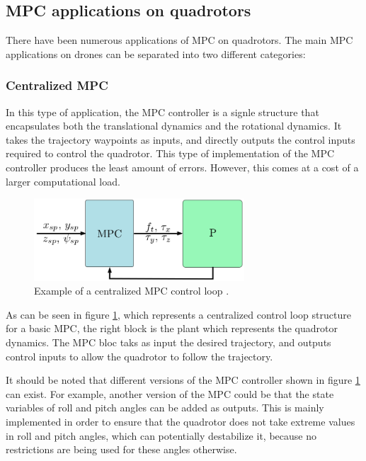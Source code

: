 \documentclass{thesisreport}
\begin{document}
\subsection{MPC applications on quadrotors}

 There have been numerous applications of MPC on quadrotors. The main MPC applications on drones can be separated into two different categories:

\subsubsection{Centralized MPC}
 
In this type of application, the MPC controller is a signle structure that encapsulates both the translational dynamics and the rotational dynamics. It takes the trajectory waypoints as inputs, and directly outputs the control inputs required to control the quadrotor. This type of implementation of the MPC controller produces the least amount of errors. However, this comes at a cost of a larger computational load.

\begin{figure}[h]
	\centering
	\includegraphics[width=0.7\textwidth]{Images/Control/MPC/centralized_mpc.png}
	\caption{Example of a centralized MPC control loop \cite{Alvarez-Valle2019}.}
	\label{fig:centralized_mpc}
\end{figure}

As can be seen in figure \ref{fig:centralized_mpc}, which represents a centralized control loop structure for a basic MPC, the right block is the plant which represents the quadrotor dynamics. The MPC bloc taks as input the desired trajectory, and outputs control inputs to allow the quadrotor to follow the trajectory.

It should be noted that different versions of the MPC controller shown in figure \ref{fig:centralized_mpc} can exist. For example, another version of the MPC could be that the state variables of roll and pitch angles can be added as outputs. This is mainly implemented in order to ensure that the quadrotor does not take extreme values in roll and pitch angles, which can potentially destabilize it, because no restrictions are being used for these angles otherwise.
\end{document}

